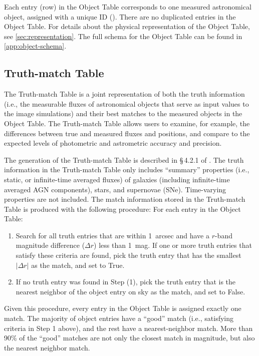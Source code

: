 \documentclass[modern]{descnote}
\begin{document}
Each entry (row) in the Object Table corresponds to one measured astronomical object, assigned with a unique ID (). There are no duplicated entries in the Object Table. For details about the physical representation of the Object Table, see \autoref{sec:representation}. The full schema for the Object Table can be found in \autoref{app:object-schema}. 

\subsection{Truth-match Table}
\label{sec:truth}

The Truth-match Table is a joint representation of both the truth information (i.e., the measurable fluxes of astronomical objects that serve as input values to the image simulations) and their best matches to the measured objects in the Object Table. The Truth-match Table allows users to examine, for example, the differences between true and measured fluxes and positions, and compare to the expected levels of photometric and astrometric accuracy and precision.

The generation of the Truth-match Table is described in \S\,4.2.1 of \cite{2020arXiv201005926L}. The truth information in the Truth-match Table only includes ``summary'' properties (i.e., static, or infinite-time averaged fluxes) of galaxies (including infinite-time averaged AGN components), stars, and supernovae (SNe). Time-varying properties are not included. The match information stored in the  Truth-match Table is produced with the following procedure: For each entry in the Object Table:
\begin{enumerate}
    \item Search for all truth entries that are within 1~arcsec and have a $r$-band magnitude difference ($\Delta r$) less than 1~mag. If one or more truth entries that satisfy these criteria are found, pick the truth entry that has the smallest $|\Delta r|$ as the match, and set  to True.
    \item If no truth entry was found in Step (1), pick the truth entry that is the nearest neighbor of the object entry on sky as the match, and set  to False.
\end{enumerate}
Given this procedure, every entry in the Object Table is assigned exactly one match. The majority of object entries have a ``good'' match (i.e., satisfying criteria in Step 1 above), and the rest have a nearest-neighbor match. More than 90\% of the ``good'' matches are not only the closest match in magnitude, but also the nearest neighbor match. 
\end{document}
